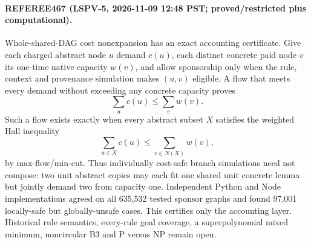 \paragraph{REFEREE467 (LSPV-5, 2026-11-09 12:48 PST; proved/restricted plus computational).}
Whole-shared-DAG cost nonexpansion has an exact accounting certificate.  Give
each charged abstract node $u$ demand $c(u)$, each distinct concrete paid node
$v$ its one-time native capacity $w(v)$, and allow sponsorship only when the
rule, context and provenance simulation makes $(u,v)$ eligible.  A flow that
meets every demand without exceeding any concrete capacity proves
\[
 \sum_u c(u)\leq\sum_v w(v).
\]
Such a flow exists exactly when every abstract subset $X$ satisfies the
weighted Hall inequality
\[
 \sum_{u\in X}c(u)\leq\sum_{v\in N(X)}w(v),
\]
by max-flow/min-cut.  Thus individually cost-safe branch simulations need not
compose: two unit abstract copies may each fit one shared unit concrete lemma
but jointly demand two from capacity one.  Independent Python and Node
implementations agreed on all 635,532 tested sponsor graphs and found 97,001
locally-safe but globally-unsafe cases.  This certifies only the accounting
layer.  Historical rule semantics, every-rule goal coverage, a
superpolynomial mixed minimum, noncircular B3 and P versus NP remain open.
